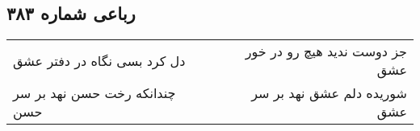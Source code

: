\begin{center}
\section*{رباعی شماره ۳۸۳}
\label{sec:sh383}
\begin{longtable}{l p{0.5cm} r}
دل کرد بسی نگاه در دفتر عشق
&&
جز دوست ندید هیچ رو در خور عشق
\\
چندانکه رخت حسن نهد بر سر حسن
&&
شوریده دلم عشق نهد بر سر عشق
\\
\end{longtable}
\end{center}
